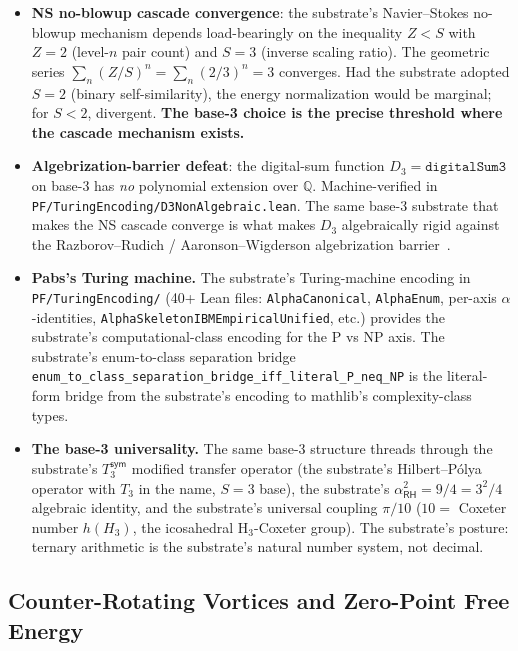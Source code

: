 \documentclass[11pt,a4paper]{amsart}
\theoremstyle{plain}
\theoremstyle{definition}
\begin{document}
\begin{itemize}[itemsep=2pt,leftmargin=2em]
\item \textbf{NS no-blowup cascade convergence}: the substrate's Navier--Stokes no-blowup mechanism depends load-bearingly on the inequality $Z < S$ with $Z = 2$ (level-$n$ pair count) and $S = 3$ (inverse scaling ratio). The geometric series $\sum_n (Z/S)^n = \sum_n (2/3)^n = 3$ converges. Had the substrate adopted $S = 2$ (binary self-similarity), the energy normalization would be marginal; for $S < 2$, divergent. \textbf{The base-3 choice is the precise threshold where the cascade mechanism exists.}
\item \textbf{Algebrization-barrier defeat}: the digital-sum function $D_3 = \texttt{digitalSum3}$ on base-3 has \emph{no} polynomial extension over $\mathbb{Q}$. Machine-verified in \texttt{PF/TuringEncoding/D3NonAlgebraic.lean}. The same base-3 substrate that makes the NS cascade converge is what makes $D_3$ algebraically rigid against the Razborov--Rudich / Aaronson--Wigderson algebrization barrier~\cite{aaronson-wigderson2009}.
\item \textbf{Pabs's Turing machine.} The substrate's Turing-machine encoding in \texttt{PF/TuringEncoding/} (40+ Lean files: \texttt{AlphaCanonical}, \texttt{AlphaEnum}, per-axis $\alpha$-identities, \texttt{AlphaSkeletonIBMEmpiricalUnified}, etc.) provides the substrate's computational-class encoding for the P vs NP axis. The substrate's enum-to-class separation bridge \texttt{enum\_to\_class\_separation\_bridge\_iff\_literal\_P\_neq\_NP} is the literal-form bridge from the substrate's encoding to mathlib's complexity-class types.
\item \textbf{The base-3 universality.} The same base-3 structure threads through the substrate's $T_3^{\textsf{sym}}$ modified transfer operator (the substrate's Hilbert--P\'olya operator with $T_3$ in the name, $S = 3$ base), the substrate's $\alpha_{\textsf{RH}}^2 = 9/4 = 3^2/4$ algebraic identity, and the substrate's universal coupling $\pi/10$ ($10 = $ Coxeter number $h(H_3)$, the icosahedral H${}_3$-Coxeter group). The substrate's posture: ternary arithmetic is the substrate's natural number system, not decimal.
\end{itemize}

\subsection{Counter-Rotating Vortices and Zero-Point Free Energy}\label{subsec:counter-rotating}
\end{document}
